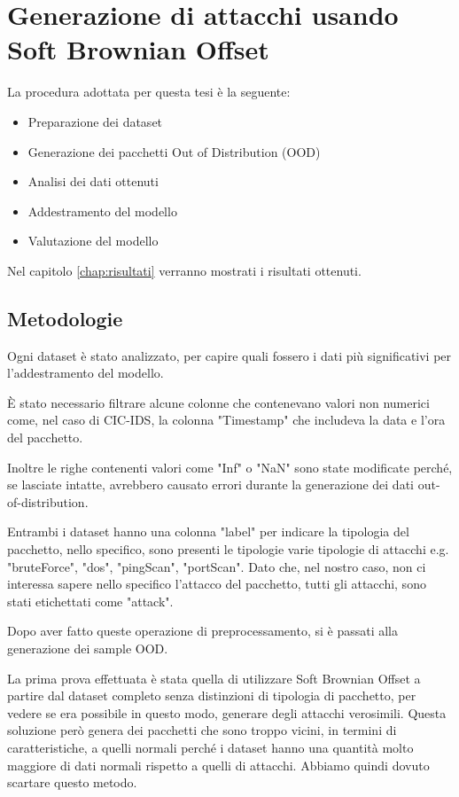 \chapter{Generazione di attacchi usando Soft Brownian Offset}
\label{chap:generazione_di_attacchi_usando_sbo}

La procedura adottata per questa tesi è la seguente:

\begin{itemize}
    \item Preparazione dei dataset
    \item Generazione dei pacchetti Out of Distribution (OOD)
    \item Analisi dei dati ottenuti
    \item Addestramento del modello
    \item Valutazione del modello
\end{itemize}



Nel capitolo \ref{chap:risultati} verranno mostrati i risultati ottenuti.


\section{Metodologie}

Ogni dataset è stato analizzato, per capire quali fossero i dati più significativi per l'addestramento del modello. 

È stato necessario filtrare alcune colonne che contenevano valori non numerici come, nel caso di CIC-IDS, la colonna "Timestamp" che includeva la data e l'ora del pacchetto. 

Inoltre le righe contenenti valori come "Inf" o "NaN" sono state modificate perché, se lasciate intatte, avrebbero causato errori durante la generazione dei dati out-of-distribution.

Entrambi i dataset hanno una colonna "label" per indicare la tipologia del pacchetto, nello specifico, sono presenti le tipologie varie tipologie di attacchi e.g. "bruteForce", "dos", "pingScan", "portScan". Dato che, nel nostro caso, non ci interessa sapere nello specifico l'attacco del pacchetto, tutti gli attacchi, sono stati etichettati come "attack".

Dopo aver fatto queste operazione di preprocessamento, si è passati alla generazione dei sample OOD.

La prima prova effettuata è stata quella di utilizzare Soft Brownian Offset a partire dal dataset completo senza distinzioni di tipologia di pacchetto, per vedere se era possibile in questo modo, generare degli attacchi verosimili. Questa soluzione però genera dei pacchetti che sono troppo vicini, in termini di caratteristiche, a quelli normali perché i dataset hanno una quantità molto maggiore di dati normali rispetto a quelli di attacchi. Abbiamo quindi dovuto scartare questo metodo.

